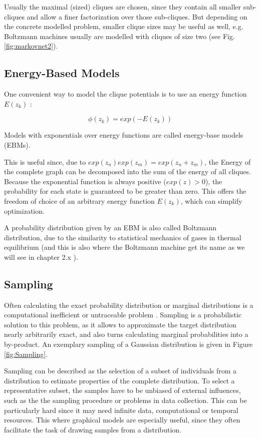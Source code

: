 Usually the maximal (sized) cliques are chosen, since they contain all smaller sub-cliques and allow a finer factorization over those sub-cliques.
But depending on the concrete modelled problem, smaller clique sizes may be useful as well, e.g. Boltzmann machines usually are modelled with cliques of size two (see Fig. \ref{fig:markovnet2}).




\subsection{Energy-Based Models}

One convenient way to model the clique potentials is to use an energy function $E(z_k)$ \cite{Goodfellow-et-al-2016-Book}: 

\[
\phi(z_k) = exp(- E(z_k))
\]

Models with exponentials over energy functions are called energy-base models (EBMs).

This is useful since, due to $exp(z_n)exp(z_m) = exp(z_n+z_m)$, the Energy of the complete graph can be decomposed into the sum of the energy of all cliques.
Because the exponential function is always positive ($exp(z) > 0$), the probability for each state is guaranteed to be greater than zero. 
This offers the freedom of choice of an arbitrary energy function $E(z_k)$, which can simplify optimization. 

A probability distribution given by an EBM is also called Boltzmann distribution, due to the similarity to statistical mechanics of gases in thermal equilibrium (and this is also where the Boltzmann machine get its name as we will see in chapter 2.x ).

\subsection{Sampling}

Often calculating the exact probability distribution or marginal distributions is a computational inefficient or untraceable problem \cite{Goodfellow-et-al-2016-Book} \cite{Petrovici2016}.
Sampling is a probabilistic solution to this problem, as it allows to approximate the target distribution nearly arbitrarily exact, and also turns calculating marginal probabilities into a by-product.  
An exemplary sampling of a Gaussian distribution is given in Figure \ref{fig:Sampling}.

Sampling can be described as the selection of a subset of individuals from a distribution to estimate properties of the complete distribution.
To select a representative subset, the samples have to be unbiased of external influences, such as the the sampling procedure or problems in data collection.
This can be particularly hard since it may need infinite data, computational or temporal resources.
This where graphical models are especially useful, since they often facilitate the task of drawing samples from a distribution.

